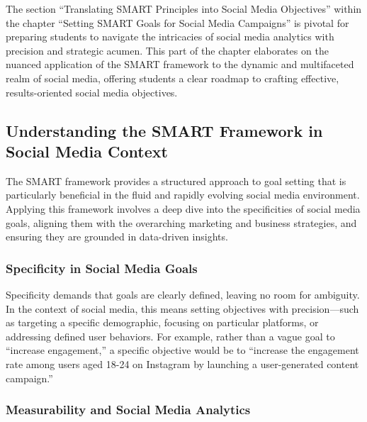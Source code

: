 \documentclass[
]{book}
\begin{document}
The section ``Translating SMART Principles into Social Media Objectives'' within the chapter ``Setting SMART Goals for Social Media Campaigns'' is pivotal for preparing students to navigate the intricacies of social media analytics with precision and strategic acumen. This part of the chapter elaborates on the nuanced application of the SMART framework to the dynamic and multifaceted realm of social media, offering students a clear roadmap to crafting effective, results-oriented social media objectives.

\hypertarget{understanding-the-smart-framework-in-social-media-context}{%
\subsection*{Understanding the SMART Framework in Social Media Context}\label{understanding-the-smart-framework-in-social-media-context}}

The SMART framework provides a structured approach to goal setting that is particularly beneficial in the fluid and rapidly evolving social media environment. Applying this framework involves a deep dive into the specificities of social media goals, aligning them with the overarching marketing and business strategies, and ensuring they are grounded in data-driven insights.

\hypertarget{specificity-in-social-media-goals}{%
\subsubsection*{Specificity in Social Media Goals}\label{specificity-in-social-media-goals}}

Specificity demands that goals are clearly defined, leaving no room for ambiguity. In the context of social media, this means setting objectives with precision---such as targeting a specific demographic, focusing on particular platforms, or addressing defined user behaviors. For example, rather than a vague goal to ``increase engagement,'' a specific objective would be to ``increase the engagement rate among users aged 18-24 on Instagram by launching a user-generated content campaign.''

\hypertarget{measurability-and-social-media-analytics}{%
\subsubsection*{Measurability and Social Media Analytics}\label{measurability-and-social-media-analytics}}
\end{document}
